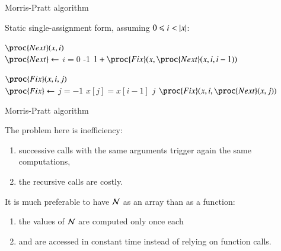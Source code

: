 %
\begin{frame}{Morris-Pratt algorithm}

Static single-assignment form, assuming \(0 \leqslant i < \left\lvert\smash{x}\right\rvert\):
\begin{codebox}
\(\proc{Next}(x, i)\)\\
\li \(\proc{Next} \gets \)  \(i = 0\)  -1  \(1 + \proc{Fix}(x, \proc{Next}(x, i, i-1))\)
\End
\end{codebox}

\begin{codebox}
\(\proc{Fix}(x, i, j)\)\\
\li \(\proc{Fix} \gets \)  \(j = -1\) \LogOr \(x[j] = x[i-1]\)
 \(j\)  \(\proc{Fix}(x, i, \proc{Next}(x, j))\)
\end{codebox}

\end{frame}

%
\begin{frame}{Morris-Pratt algorithm}

The problem here is inefficiency:
\begin{enumerate}

  \item successive calls with the same arguments trigger again the
    same computations,

  \item the recursive calls are costly.

\end{enumerate}

\bigskip

It is much preferable to have \(\mathcal{N}\) as an array than as a
function:
\begin{enumerate}

  \item the values of \(\mathcal{N}\) are computed only once each

  \item and are accessed in constant time instead of relying on
    function calls.

\end{enumerate}

\end{frame}

